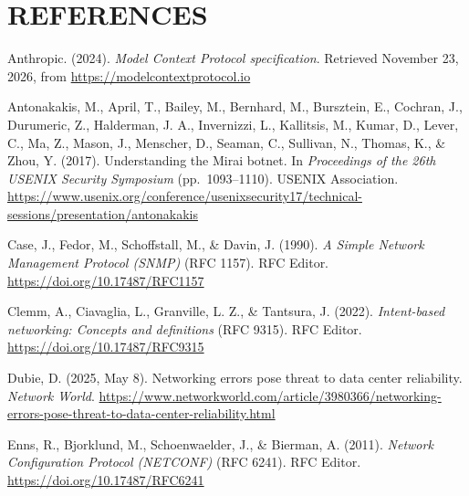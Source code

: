 \cleardoublepage
\chapter*{REFERENCES}

\begin{list}{}{%
  \setlength{\leftmargin}{2.2em}%
  \setlength{\itemindent}{-2.2em}%
  \setlength{\itemsep}{0.6em}%
  \setlength{\parsep}{0pt}}
\raggedright

\item Anthropic. (2024). \textit{Model Context Protocol specification}.
Retrieved November 23, 2026, from \url{https://modelcontextprotocol.io}

\item Antonakakis, M., April, T., Bailey, M., Bernhard, M., Bursztein, E.,
Cochran, J., Durumeric, Z., Halderman, J. A., Invernizzi, L., Kallitsis, M.,
Kumar, D., Lever, C., Ma, Z., Mason, J., Menscher, D., Seaman, C., Sullivan,
N., Thomas, K., \& Zhou, Y. (2017). Understanding the Mirai botnet. In
\textit{Proceedings of the 26th USENIX Security Symposium} (pp.~1093--1110).
USENIX Association.
\url{https://www.usenix.org/conference/usenixsecurity17/technical-sessions/presentation/antonakakis}

\item Case, J., Fedor, M., Schoffstall, M., \& Davin, J. (1990). \textit{A
Simple Network Management Protocol (SNMP)} (RFC 1157). RFC Editor.
\url{https://doi.org/10.17487/RFC1157}

\item Clemm, A., Ciavaglia, L., Granville, L. Z., \& Tantsura, J. (2022).
\textit{Intent-based networking: Concepts and definitions} (RFC 9315). RFC
Editor. \url{https://doi.org/10.17487/RFC9315}

\item Dubie, D. (2025, May 8). Networking errors pose threat to data center
reliability. \textit{Network World}.
\url{https://www.networkworld.com/article/3980366/networking-errors-pose-threat-to-data-center-reliability.html}

\item Enns, R., Bjorklund, M., Schoenwaelder, J., \& Bierman, A. (2011).
\textit{Network Configuration Protocol (NETCONF)} (RFC 6241). RFC Editor.
\url{https://doi.org/10.17487/RFC6241}


\end{list}
